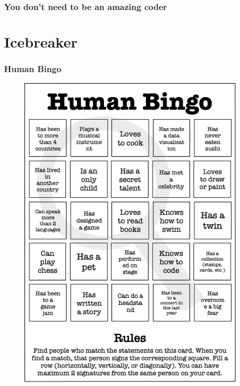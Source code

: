 \documentclass{beamer}
\begin{document}
\begin{frame}
\frametitle{You don't need to be an amazing coder}
\begin{figure}
\end{figure}
\end{frame}


\section{Icebreaker}
\begin{frame}
\frametitle{Human Bingo}
\begin{figure}
\includegraphics[width=.8\textwidth, angle=10]{figures/human_bingo.png}
\end{figure}
\end{frame}
\end{document}
